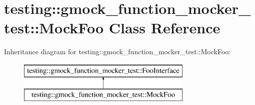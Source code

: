 \hypertarget{classtesting_1_1gmock__function__mocker__test_1_1MockFoo}{}\section{testing\+:\+:gmock\+\_\+function\+\_\+mocker\+\_\+test\+:\+:Mock\+Foo Class Reference}
\label{classtesting_1_1gmock__function__mocker__test_1_1MockFoo}
Inheritance diagram for testing\+:\+:gmock\+\_\+function\+\_\+mocker\+\_\+test\+:\+:Mock\+Foo\+:\begin{figure}[H]
\begin{center}
\leavevmode
\includegraphics[height=2.000000cm]{classtesting_1_1gmock__function__mocker__test_1_1MockFoo}
\end{center}
\end{figure}
